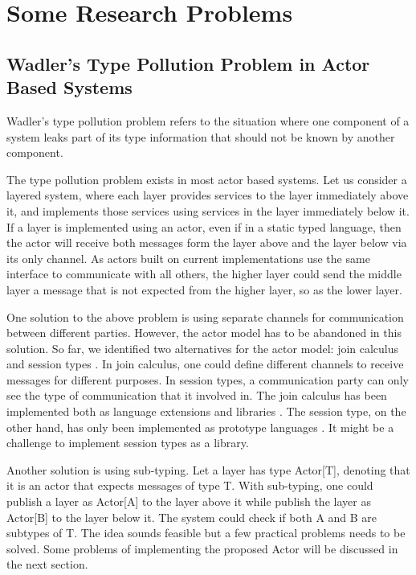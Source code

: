 \section{Some Research Problems}
\label{problems}

\subsection{Wadler's Type Pollution Problem in Actor Based Systems}
\label{type_pollution}
Wadler's type pollution problem refers to the situation where one component of a system leaks part of its type information that should not be known by another component.

The type pollution problem exists in most actor based systems.  Let us consider a layered system\cite{DijkstraTHE}, where each layer provides services to the layer immediately above it, and implements those services using services in the layer immediately below it.  If a layer is implemented using an actor, even if in a static typed language, then the actor will receive both messages form the layer above and the layer below via its only channel.  As actors built on current implementations\cite{actor_1, actor_2} use the same interface to communicate with all others, the higher layer could send the middle layer a message that is not expected from the higher layer, so as the lower layer.

One solution to the above problem is using separate channels for communication between different parties.  However, the actor model has to be abandoned in this solution.  So far, we identified two alternatives for the actor model: join calculus \cite{full_join} and session types \cite{Honda93typesfor, Honda_languageprimitives}.  In join calculus, one could define different channels to receive messages for different purposes.  In session types, a communication party can only see the type of communication that it involved in.  The join calculus has been implemented both as language extensions \cite{join_csharp} and libraries \cite{scala_joins, join-fsharp, Russo07thejoins}.  The session type, on the other hand, has only been implemented as prototype languages \cite{Honda_languageprimitives, SJ}.  It might be a challenge to implement session types as a library.

Another solution is using sub-typing.  Let a layer has type Actor[T], denoting that it is an actor that expects messages of type T.  With sub-typing, one could publish a layer as Actor[A] to the layer above it while publish the layer as Actor[B] to the layer below it.  The system could check if both A and B are subtypes of T.  The idea sounds feasible but a few practical problems needs to be solved.  Some problems of implementing the proposed Actor will be discussed in the next section.


